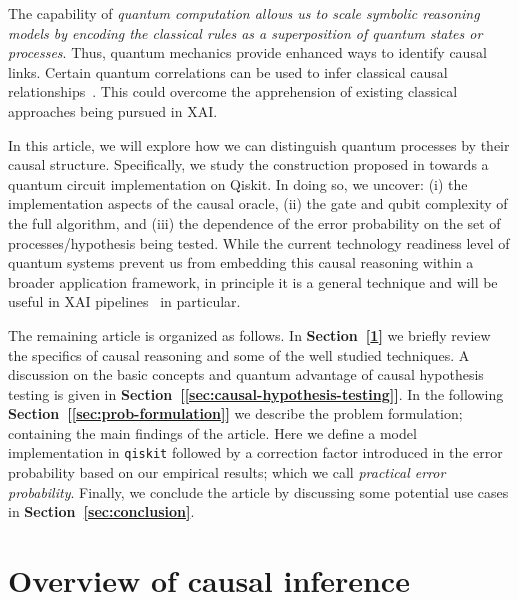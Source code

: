 The capability of \textit{quantum computation allows us to scale symbolic reasoning models by encoding the classical rules as a superposition of quantum states or processes}.
Thus, quantum mechanics provide enhanced ways to identify causal links.
Certain quantum correlations can be used to infer classical causal relationships~\cite{ried2015quantum,fitzsimons2015quantum}.
This could overcome the apprehension of existing classical approaches being pursued in XAI.

In this article, we will explore how we can distinguish quantum processes by their causal structure.
Specifically, we study the construction proposed in \cite{chiribella2019quantum} towards a quantum circuit implementation on Qiskit.
In doing so, we uncover: (i) the implementation aspects of the causal oracle, (ii) the gate and qubit complexity of the full algorithm, and (iii) the dependence of the error probability on the set of processes/hypothesis being tested.
While the current technology readiness level of quantum systems prevent us from embedding this causal reasoning within a broader application framework, in principle it is a general technique and will be useful in XAI pipelines~\cite{lavin2021simulation,maruyama2021categorical} in particular.

The remaining article is organized as follows. 
In \textbf{Section~[\ref{sec:overview-causal-inference}]} we briefly review the specifics of causal reasoning and some of the well studied techniques. A discussion on the basic concepts and quantum advantage of causal hypothesis testing is given in
\textbf{Section~[\ref{sec:causal-hypothesis-testing}]}. In the following \textbf{Section~[\ref{sec:prob-formulation}]} we describe the problem formulation; containing the main findings of the article. Here we define a model implementation in \texttt{qiskit} followed by a correction factor introduced in the error probability based on our empirical results; which we call \textit{practical error probability}. Finally, we conclude the article by discussing some potential use cases in \textbf{Section~\ref{sec:conclusion}}.

\section{Overview of causal inference} \label{sec:overview-causal-inference}

    
    
